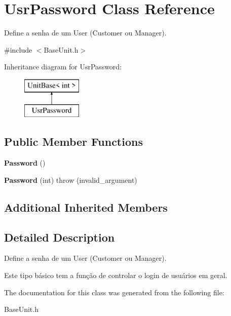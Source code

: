 \hypertarget{classUsrPassword}{\section{Usr\-Password Class Reference}
\label{classUsrPassword}
}


Define a senha de um User (Customer ou Manager).  




{\ttfamily \#include $<$Base\-Unit.\-h$>$}

Inheritance diagram for Usr\-Password\-:\begin{figure}[H]
\begin{center}
\leavevmode
\includegraphics[height=2.000000cm]{classUsrPassword}
\end{center}
\end{figure}
\subsection*{Public Member Functions}
\begin{DoxyCompactItemize}
\item 
\hypertarget{classUsrPassword_ad08a7c4a7e940186d4d23a5347ea7080}{{\bfseries Password} ()}\label{classUsrPassword_ad08a7c4a7e940186d4d23a5347ea7080}

\item 
\hypertarget{classUsrPassword_a42ff4b71c0c413ae5db79ea2697cc7a6}{{\bfseries Password} (int)  throw (invalid\-\_\-argument)}\label{classUsrPassword_a42ff4b71c0c413ae5db79ea2697cc7a6}

\end{DoxyCompactItemize}
\subsection*{Additional Inherited Members}


\subsection{Detailed Description}
Define a senha de um User (Customer ou Manager). 

Este tipo básico tem a função de controlar o login de usuários em geral. 

The documentation for this class was generated from the following file\-:\begin{DoxyCompactItemize}
\item 
Base\-Unit.\-h\end{DoxyCompactItemize}
